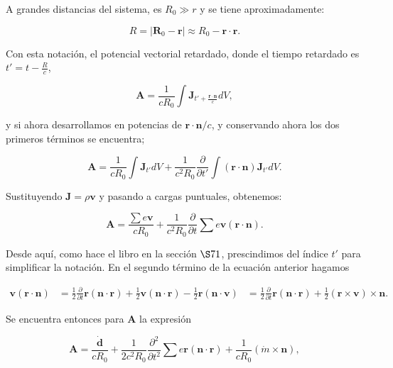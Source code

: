 \documentclass[a4paper,11pt]{article}
\numberwithin{equation}{section}
\begin{document}
\vspace{.3cm}

A grandes distancias del sistema, es $R_0 \gg r$ y se tiene aproximadamente: 

\begin{equation}
 R = |\mathbf{R}_0 - \mathbf{r}| \approx R_0 - \mathbf{r} \cdot \mathbf{r}.
\end{equation}

Con esta notación, el potencial vectorial retardado, donde el tiempo retardado 
es $t' = t - \frac{R}{c}$, 

\begin{equation}
 \mathbf{A} = \frac{1}{cR_0}\int \mathbf{J}_{t' + \frac{\mathbf{r}\cdot\mathbf{n}}{c}} dV,  
\end{equation}

y si ahora desarrollamos en potencias de $\mathbf{r}\cdot \mathbf{n}/c$, y 
conservando ahora los dos primeros términos se encuentra;

\begin{equation}
 \mathbf{A} = \frac{1}{cR_0} \int \mathbf{J}_{t'}dV + \frac{1}{c^2R_0} 
 \frac{\partial}{\partial t'} \int (\mathbf{r} \cdot \mathbf{n})\mathbf{J}_{t'} dV.
\end{equation}

Sustituyendo $\mathbf{J} = \rho \mathbf{v}$ y pasando a cargas puntuales, obtenemos:

\begin{equation}
 \mathbf{A} = \frac{\sum e \mathbf{v}}{cR_0} + \frac{1}{c^2R_0}\frac{\partial}{\partial t}
 \sum e \mathbf{v} (\mathbf{r} \cdot \mathbf{n}).
\end{equation}

Desde aquí, como hace el libro en la sección $\S 71$, prescindimos del índice $t'$
para simplificar la notación. En el segundo término de la ecuación anterior 
hagamos 

\begin{align*}
 \mathbf{v}(\mathbf{r} \cdot \mathbf{n}) &= \frac{1}{2} \frac{\partial}{\partial t}
 \mathbf{r}(\mathbf{n} \cdot \mathbf{r}) + \frac{1}{2}\mathbf{v}(\mathbf{n} \cdot \mathbf{r})
 - \frac{1}{2}\mathbf{r}(\mathbf{n} \cdot \mathbf{v})
 &=  \frac{1}{2} \frac{\partial}{\partial t}\mathbf{r}(\mathbf{n} \cdot \mathbf{r})
 + \frac{1}{2} (\mathbf{r} \times \mathbf{v}) \times \mathbf{n}.
\end{align*}

Se encuentra entonces para $\mathbf{A}$ la expresión 

\begin{equation}
 \mathbf{A} = \frac{\dot{\mathbf{d}}}{cR_0} + \frac{1}{2c^2R_0}\frac{\partial^2}{ 
 \partial t^2} \sum e \mathbf{r} (\mathbf{n} \cdot \mathbf{r}) + \frac{1}{cR_0} 
 (\dot{m} \times \mathbf{n}),
\end{equation}
\end{document}
